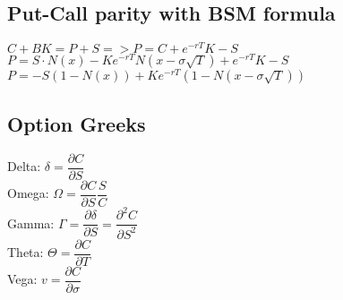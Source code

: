 \subsection*{Put-Call parity with BSM formula}
$C + BK = P + S => P = C + e^{-rT}K - S$\\
$P = S\cdot N(x) - Ke^{-rT}N(x - \sigma\sqrt{T}) + e^{-rT}K-S$\\
$P = -S(1-N(x)) + Ke^{-rT}(1-N(x-\sigma\sqrt{T}))$
\subsection*{Option Greeks}
Delta: $\delta = \dfrac{\partial C}{\partial S}$\\
Omega: $\Omega = \dfrac{\partial C}{\partial S}\dfrac{S}{C}$\\
Gamma: $\Gamma = \dfrac{\partial \delta}{\partial S} = \dfrac{\partial^2C}{\partial S^2}$\\
Theta: $\Theta = \dfrac{\partial C}{\partial T}$\\
Vega: $v = \dfrac{\partial C}{\partial \sigma}$
